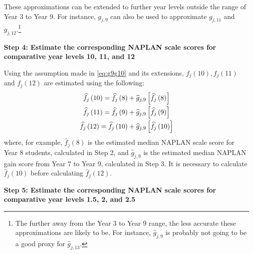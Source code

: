 These approximations can be extended to further year levels outside the range of Year 3 to Year 9. For instance, $g_{j,9}$ can also be used to approximate $g_{j,11}$ and $g_{j,12}$.\footnote{The further away from the Year 3 to Year 9 range, the less accurate these approximations are likely to be. For instance, $\widehat{g}_{j,9}$ is probably not going to be a good proxy for $\widehat{g}_{j,13}$.}

\textbf{Step 4: Estimate the corresponding NAPLAN scale scores for comparative year levels 10, 11, and 12}
\nopagebreak

Using the assumption made in \cref{eq:g9g10} and its extensions, $f_{j}(10),f_{j}(11)$ and $f_{j}(12)$ are estimated using the following:
\begin{equation} \begin{array}{c}
\widehat{f}_{j}\left(10\right) = \widehat{f}_{j}\left(8\right) + \widehat{g}_{j,9}\left[\widehat{f}_{j}\left(8\right)\right] \vspace{0.3em}\\
\widehat{f}_{j}\left(11\right) = \widehat{f}_{j}\left(9\right) + \widehat{g}_{j,9}\left[\widehat{f}_{j}\left(9\right)\right] \vspace{0.3em}\\
\widehat{f}_{j}\left(12\right) = \widehat{f}_{j}\left(10\right) + \widehat{g}_{j,9}\left[\widehat{f}_{j}\left(10\right)\right]
\end{array} \end{equation}
where, for example, $\widehat{f}_{j}(8)$ is the estimated median NAPLAN scale score for Year 8 students, calculated in Step 2, and $\widehat{g}_{j,9}$ is the estimated median NAPLAN gain score from Year 7 to Year 9, calculated in Step 3. It is necessary to calculate $\widehat{f}_{j}(10)$ before calculating $\widehat{f}_{j}(12)$.

\textbf{Step 5: Estimate the corresponding NAPLAN scale scores for comparative year levels 1.5, 2, and 2.5}
\nopagebreak

